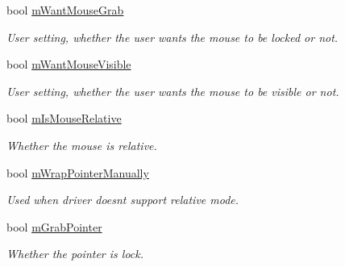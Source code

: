 \begin{DoxyCompactItemize}
bool \hyperlink{class_common_1_1_sdl_input_handler_a97824bb249c9debfd331171ad3d27c01}{m\+Want\+Mouse\+Grab}
\begin{DoxyCompactList}\small\item\em User setting, whether the user wants the mouse to be locked or not. \end{DoxyCompactList}\item 
\mbox{\label{class_common_1_1_sdl_input_handler_a81ef820ecd55818d7ae9ff59edd1a5c1}} 
bool \hyperlink{class_common_1_1_sdl_input_handler_a81ef820ecd55818d7ae9ff59edd1a5c1}{m\+Want\+Mouse\+Visible}
\begin{DoxyCompactList}\small\item\em User setting, whether the user wants the mouse to be visible or not. \end{DoxyCompactList}\item 
\mbox{\label{class_common_1_1_sdl_input_handler_ab94a01e84010e763d1bb1cabf999faad}} 
bool \hyperlink{class_common_1_1_sdl_input_handler_ab94a01e84010e763d1bb1cabf999faad}{m\+Is\+Mouse\+Relative}
\begin{DoxyCompactList}\small\item\em Whether the mouse is relative. \end{DoxyCompactList}\item 
\mbox{\label{class_common_1_1_sdl_input_handler_a11822c2b4a5d7b2b09124b7b86baed4f}} 
bool \hyperlink{class_common_1_1_sdl_input_handler_a11822c2b4a5d7b2b09124b7b86baed4f}{m\+Wrap\+Pointer\+Manually}
\begin{DoxyCompactList}\small\item\em Used when driver doesn\textquotesingle{}t support relative mode. \end{DoxyCompactList}\item 
\mbox{\label{class_common_1_1_sdl_input_handler_a44b7f460f026184e21a0889a7724bd82}} 
bool \hyperlink{class_common_1_1_sdl_input_handler_a44b7f460f026184e21a0889a7724bd82}{m\+Grab\+Pointer}
\begin{DoxyCompactList}\small\item\em Whether the pointer is lock. \end{DoxyCompactList}\item 

\end{DoxyCompactItemize}
